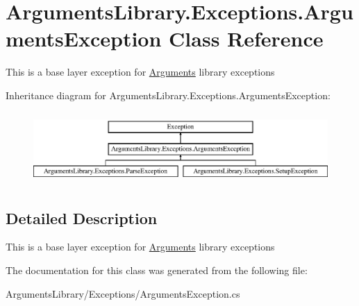 \hypertarget{class_arguments_library_1_1_exceptions_1_1_arguments_exception}{\section{Arguments\+Library.\+Exceptions.\+Arguments\+Exception Class Reference}
\label{class_arguments_library_1_1_exceptions_1_1_arguments_exception}
}


This is a base layer exception for \hyperlink{class_arguments_library_1_1_arguments}{Arguments} library exceptions  


Inheritance diagram for Arguments\+Library.\+Exceptions.\+Arguments\+Exception\+:\begin{figure}[H]
\begin{center}
\leavevmode
\includegraphics[height=2.754098cm]{d7/df5/class_arguments_library_1_1_exceptions_1_1_arguments_exception}
\end{center}
\end{figure}


\subsection{Detailed Description}
This is a base layer exception for \hyperlink{class_arguments_library_1_1_arguments}{Arguments} library exceptions 



The documentation for this class was generated from the following file\+:\begin{DoxyCompactItemize}
\item 
Arguments\+Library/\+Exceptions/Arguments\+Exception.\+cs\end{DoxyCompactItemize}
